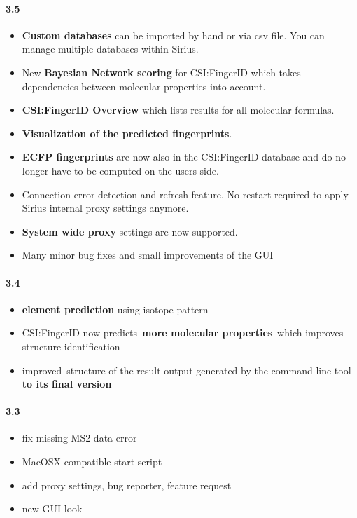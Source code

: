 \paragraph{3.5}

\begin{itemize}

\item
  \textbf{Custom databases} can be imported by hand or via csv file. You
  can manage multiple databases within Sirius.
\item
  New \textbf{Bayesian Network scoring} for CSI:FingerID which takes
  dependencies between molecular properties into account.
\item
  \textbf{CSI:FingerID Overview} which lists results for all molecular
  formulas.
\item
  \textbf{Visualization of the predicted fingerprints}.
\item
  \textbf{ECFP fingerprints} are now also in the CSI:FingerID database
  and do no longer have to be computed on the users side.
\item
  Connection error detection and refresh feature. No restart required to apply Sirius internal proxy settings anymore.
\item
  \textbf{System wide proxy} settings are now supported.
\item
  Many minor bug fixes and small improvements of the GUI
\end{itemize}

\paragraph{3.4}

\begin{itemize}

\item
  \textbf{element prediction} using isotope pattern
\item
  CSI:FingerID now predicts~\textbf{more molecular properties}~which
  improves structure identification
\item
  improved~structure of the result output generated by the command line
  tool \textbf{to its final version}
\end{itemize}

\paragraph{3.3}

\begin{itemize}

\item
  fix missing MS2 data error
\item
  MacOSX compatible start script
\item
  add proxy settings, bug reporter, feature request
\item
  new GUI look
\end{itemize}

